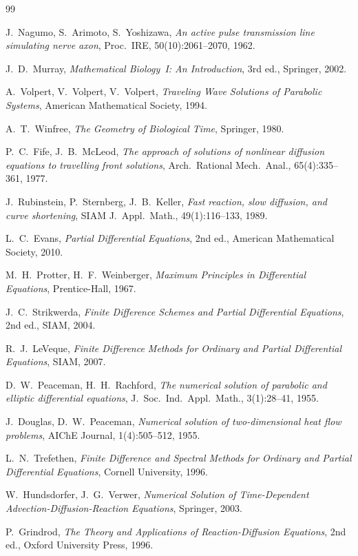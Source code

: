 \documentclass[11pt,a4paper]{report}
\begin{document}
\begin{thebibliography}{99}

J.~Nagumo, S.~Arimoto, S.~Yoshizawa,
\textit{An active pulse transmission line simulating nerve axon},
Proc.~IRE, 50(10):2061--2070, 1962.

J.~D.~Murray,
\textit{Mathematical Biology~I: An Introduction},
3rd ed., Springer, 2002.

A.~Volpert, V.~Volpert, V.~Volpert,
\textit{Traveling Wave Solutions of Parabolic Systems},
American Mathematical Society, 1994.

A.~T.~Winfree,
\textit{The Geometry of Biological Time},
Springer, 1980.

P.~C.~Fife, J.~B.~McLeod,
\textit{The approach of solutions of nonlinear diffusion equations to
travelling front solutions},
Arch.~Rational Mech.~Anal., 65(4):335--361, 1977.

J.~Rubinstein, P.~Sternberg, J.~B.~Keller,
\textit{Fast reaction, slow diffusion, and curve shortening},
SIAM J.~Appl.~Math., 49(1):116--133, 1989.

L.~C.~Evans,
\textit{Partial Differential Equations},
2nd ed., American Mathematical Society, 2010.

M.~H.~Protter, H.~F.~Weinberger,
\textit{Maximum Principles in Differential Equations},
Prentice-Hall, 1967.

J.~C.~Strikwerda,
\textit{Finite Difference Schemes and Partial Differential Equations},
2nd ed., SIAM, 2004.

R.~J.~LeVeque,
\textit{Finite Difference Methods for Ordinary and Partial Differential Equations},
SIAM, 2007.

D.~W.~Peaceman, H.~H.~Rachford,
\textit{The numerical solution of parabolic and elliptic differential equations},
J.~Soc.~Ind.~Appl.~Math., 3(1):28--41, 1955.

J.~Douglas, D.~W.~Peaceman,
\textit{Numerical solution of two-dimensional heat flow problems},
AIChE Journal, 1(4):505--512, 1955.

L.~N.~Trefethen,
\textit{Finite Difference and Spectral Methods for Ordinary and
Partial Differential Equations},
Cornell University, 1996.

W.~Hundsdorfer, J.~G.~Verwer,
\textit{Numerical Solution of Time-Dependent Advection-Diffusion-Reaction Equations},
Springer, 2003.

P.~Grindrod,
\textit{The Theory and Applications of Reaction-Diffusion Equations},
2nd ed., Oxford University Press, 1996.

\end{thebibliography}
\end{document}
